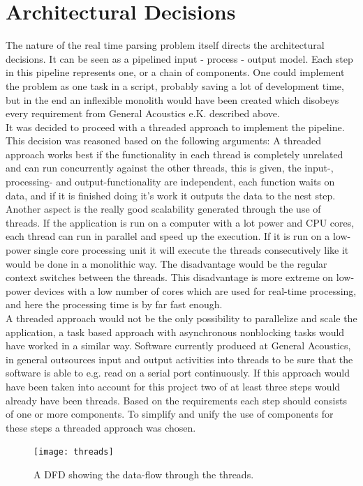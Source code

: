 \section{Architectural Decisions}
The nature of the real time parsing problem itself directs the architectural decisions. It can be seen as a pipelined input - process - output model. Each step in this pipeline represents one, or a chain of components. One could implement the problem as one task in a script, probably saving a lot of development time, but in the end an inflexible monolith would have been created which disobeys every requirement from General Acoustics e.K. described above.\\ It was decided to proceed with a threaded approach to implement the pipeline. This decision was reasoned based on the following arguments: A threaded approach works best if the functionality in each thread is completely unrelated and can run concurrently against the other threads, this is given, the input-, processing- and output-functionality are independent, each function waits on data, and if it is finished doing it's work it outputs the data to the nest step. Another aspect is the really good scalability generated through the use of threads. If the application is run on a computer with a lot power and CPU cores, each thread can run in parallel and speed up the execution. If it is run on a low-power single core processing unit it will execute the threads consecutively like it would be done in a monolithic way. The disadvantage would be the regular context switches between the threads. This disadvantage is more extreme on low-power devices with a low number of cores which are used for real-time processing, and here the processing time is by far fast enough.\\ A threaded approach would not be the only possibility to parallelize and scale the application, a task based approach with asynchronous nonblocking tasks would have worked in a similar way. Software currently produced at General Acoustics, in general outsources input and output activities into threads to be sure that the software is able to e.g. read on a serial port continuously. If this approach would have been taken into account for this project two of at least three steps would already have been threads. Based on the requirements each step should consists of one or more components. To simplify and unify the use of components for these steps a threaded approach was chosen.\\
\begin{figure}[h]
\centering
      \texttt{[image: threads]}
        \caption{A DFD showing the data-flow through the threads.}
\end{figure}

